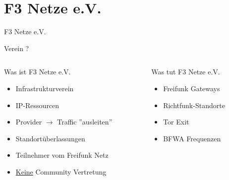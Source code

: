 \section{F3 Netze e.V.}

\begin{frame}{}
    \begin{center}
        F3 Netze e.V.
     \end{center}
\end{frame}

\begin{frame}{Verein ?}
    \begin{columns}[T]
        \begin{column}{0.45\textwidth}
            Was ist F3 Netze e.V.
            \begin{itemize}
                \item Infrastrukturverein
                \item IP-Ressourcen
                \item Provider $\rightarrow$ Traffic ''ausleiten''
                \item Standortüberlassungen
                \item Teilnehmer vom Freifunk Netz
                \item \underline{Keine} Community Vertretung
            \end{itemize}
        \end{column}
        \begin{column}{0.45\textwidth}
            Was tut F3 Netze e.V.
            \begin{itemize}
                \item Freifunk Gateways
                \item Richtfunk-Standorte
                \item Tor Exit
                \item BFWA Frequenzen
            \end{itemize}
        \end{column}
    \end{columns}
\end{frame}

